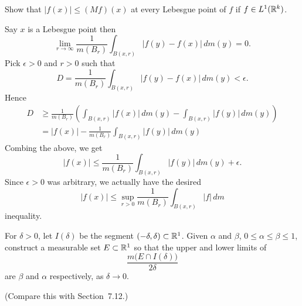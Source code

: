 \begin{enumerate}


\begin{excopy}
Show that \(|f(x)| \leq (Mf)(x)\) at every Lebesgue point of $f$ if 
\(f\in L^1(\mathbb{R}^k)\).
\end{excopy}

Say $x$ is a Lebesgue point
then
\begin{equation*}
\lim_{r\to\infty} \frac{1}{m(B_r)} \int_{B(x,r)} |f(y)-f(x)|\,dm(y) = 0.
\end{equation*}
Pick \(\epsilon>0\) and \(r>0\) such that
\begin{equation*}
D = \frac{1}{m(B_r)} \int_{B(x,r)} |f(y)-f(x)|\,dm(y) < \epsilon.
\end{equation*}
Hence
\begin{align*}
D 
&\geq \frac{1}{m(B_r)} \left( \int_{B(x,r)} |f(x)|\,dm(y) - 
                             \int_{B(x,r)} |f(y)|\,dm(y) \right) \\
&=  |f(x)| - \frac{1}{m(B_r)} \int_{B(x,r)} |f(y)|\,dm(y) 
\end{align*}
Combing the above, we get
\begin{equation*}
|f(x)| \leq \frac{1}{m(B_r)} \int_{B(x,r)} |f(y)|\,dm(y) + \epsilon.
\end{equation*}
Since \(\epsilon>0\) was arbitrary, we actually have 
the desired
\begin{equation*}
|f(x)| \leq \sup_{r>0} \frac{1}{m(B_r)} \int_{B(x,r)} |f|\,dm
\end{equation*}
inequality.


\begin{excopy}
For \(\delta>0\), let \(I(\delta)\) be the 
segment \((-\delta,\delta) \subset \mathbb{R}^1\). Given \(\alpha\) and \(\beta\),
\(0\leq\alpha\leq \beta\leq 1\),
construct a measurable set \(E\subset \mathbb{R}^1\) so that the upper and lower
limits of 
\begin{equation*}
\frac{m\bigl(E\cap I(\delta)\bigr)}{2\delta}
\end{equation*}
are \(\beta\) and \(\alpha\) respectively, as \(\delta\rightarrow 0\).

(Compare this with Section~7.12.)
\end{excopy}


\end{enumerate}
